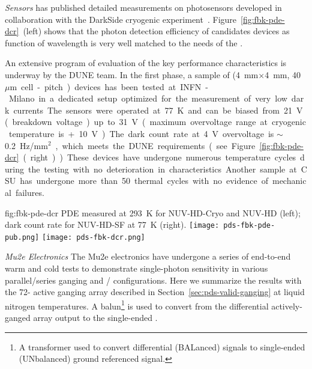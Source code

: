 \textit{ Sensors} 
 has published detailed measurements on photosensors developed in collaboration with the DarkSide cryogenic experiment~\cite{Gola:2019idb}. Figure~\ref{fig:fbk-pde-dcr}~(left) shows that the photon detection efficiency of candidates devices as function of wavelength is very well matched to the needs of the .

An extensive program of evaluation of the key performance characteristics is underway by the DUNE  team.
In the first phase, a sample of (\SI{4}{mm}$\times$\SI{4}{mm}, \SI{40}{$\mu$m} cell-pitch) devices has been tested at INFN-Milano in a dedicated setup optimized for the measurement of very low dark currents. The sensors were operated at \SI{77}{K} and can be biased from \SI{21}{V} (breakdown voltage) up to \SI{31}{V} (maximum overvoltage range at cryogenic temperature is +\SI{10}{V}). The dark count rate at \SI{+4}{V} overvoltage is $\sim$\SI{0.2}{Hz/mm$^2$}, which meets the DUNE requirements (see Figure~\ref{fig:fbk-pde-dcr}~(right)). 
These devices have undergone numerous temperature cycles during the testing with no deterioration in characteristics. Another sample at CSU has undergone more than 50 thermal cycles with no evidence of mechanical failures.  

\begin{dunefigure}
 {fig:fbk-pde-dcr}
 {PDE measured at \SI{293}{K} for  NUV-HD-Cryo and NUV-HD  (left); dark count rate for NUV-HD-SF  at \SI{77}{K} (right).}
\texttt{[image: pds-fbk-pde-pub.png]}
\texttt{[image: pds-fbk-dcr.png]}
\end{dunefigure}


\textit{Mu2e Electronics}
The Mu2e electronics have undergone a series of end-to-end warm and cold tests to demonstrate single-photon sensitivity in various parallel/series ganging and / configurations. Here we summarize the results with the 72- active ganging array described in Section~\ref{sec:pds-valid-ganging}
 at liquid nitrogen temperatures. 
A balun\footnote{A transformer used to convert differential (BALanced) signals to single-ended (UNbalanced) ground referenced signal.} is used to convert from the differential actively-ganged  array output to the single-ended .


